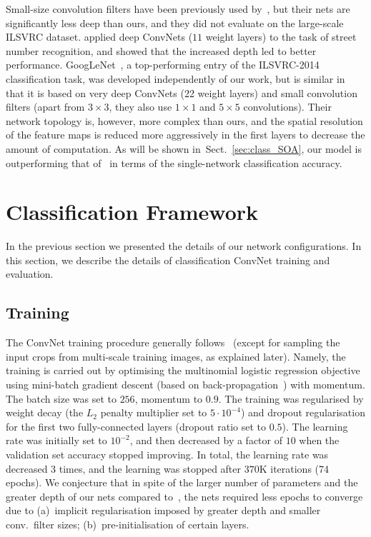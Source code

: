 \documentclass{article} %
\newcommand{\sref}[1]{Sect.~\ref{#1}}
\begin{document}
Small-size convolution filters have been previously used by~\citet{Ciresan11}, but their nets are significantly less deep than ours, and they did not
evaluate on the large-scale ILSVRC dataset. 
\citet{Goodfellow13} applied deep ConvNets ($11$ weight layers) to the task of street number recognition, and showed that the increased depth led to better performance.
GoogLeNet~\citep{Szegedy14}, a top-performing entry of the ILSVRC-2014 classification task, was developed independently of our work, but is similar in that it is based on very deep ConvNets (22 weight layers) and small convolution filters (apart from $3\times 3$, they also use $1\times 1$ and \mbox{$5\times 5$} convolutions). Their network topology is, however, more complex than ours, and the spatial resolution of the feature maps is reduced more aggressively in the first layers to decrease the amount of computation. As will be shown in~\sref{sec:class_SOA}, our model is outperforming that of~\citet{Szegedy14} in terms of the single-network classification accuracy.

\section{Classification Framework}
\label{sec:learning}
In the previous section we presented the details of our network configurations. In this section, we describe the details of classification ConvNet training and evaluation.

\subsection{Training}
\label{sec:train}
The ConvNet training procedure generally follows~\citet{Krizhevsky12} (except for sampling the input crops from multi-scale training images, as explained later).
Namely, the training is carried out by optimising the multinomial logistic regression objective using mini-batch gradient descent (based on back-propagation~\citep{LeCun89}) with momentum. The batch size was set to $256$, momentum to $0.9$.
The training was regularised by weight decay (the $L_2$ penalty multiplier set to $5\cdot 10^{-4}$) and dropout regularisation for the first two fully-connected layers (dropout ratio set to $0.5$).
The learning rate was initially set to $10^{-2}$, and then decreased
by a factor of $10$ when the validation set accuracy stopped improving. In total, the learning rate was decreased 3 times, and the learning was stopped after $370$K iterations
(74 epochs). We conjecture that in spite of the larger number of parameters and the greater depth of our nets compared to~\citep{Krizhevsky12}, the nets required less epochs
to converge due to (a)~implicit regularisation imposed by greater depth and smaller conv.\ filter sizes; (b)~pre-initialisation of certain layers.
\end{document}
